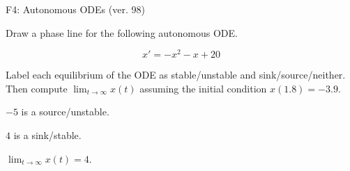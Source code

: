 \begin{exercise}
  \begin{exerciseTitle}F4: Autonomous ODEs (ver. 98)\end{exerciseTitle}
  \begin{exerciseStatement}
    

      Draw a phase line for the following 
      autonomous ODE.
    

    
\[x'= -x^{2} - x + 20\]

    

      Label each equilibrium of the ODE
      as stable/unstable and sink/source/neither.
      Then compute \(\lim_{t\to\infty}x(t)\)
      assuming the initial condition
      \(x( 1.8 )= -3.9\).
    

  \end{exerciseStatement}
  \begin{exerciseAnswer}
    

      \(-5\) is a source/unstable.
      
      \(4\) is a sink/stable.
    

    

      \(\lim_{t\to\infty}x(t)=4\).
    

  \end{exerciseAnswer}
\end{exercise}